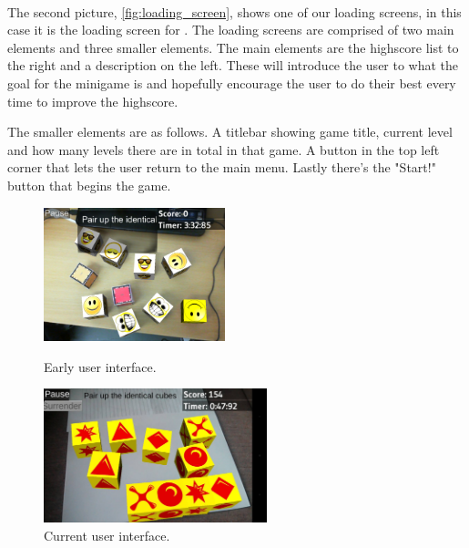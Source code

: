 \paragraph{}
The second picture, \autoref{fig:loading_screen}, shows one of our loading screens, in this case it is the loading screen for .
The loading screens are comprised of two main elements and three smaller elements.
The main elements are the highscore list to the right and a description on the left.
These will introduce the user to what the goal for the minigame is and hopefully encourage the user to do their best every time to improve the highscore.

The smaller elements are as follows. A titlebar showing game title, current level and how many levels there are in total in that game.
A button in the top left corner that lets the user return to the main menu. Lastly there's the "Start!" button that begins the game.

\begin{figure}[h]
	\centering
	\begin{minipage}{0.48\textwidth}
		\capstart
		\centering
		\includegraphics[height=110pt]{images/match_cubes_old}
		\caption[Previous UI in game.]{Early user interface.}
		\label{fig:early_user_interface}
	\end{minipage}
	\begin{minipage}{0.48\textwidth}
		\capstart
		\centering
		\includegraphics[height=110pt]{images/match_cubes_new}
		\caption[Current UI in game.]{Current user interface.}
		\label{fig:current_user_interface}
	\end{minipage}
\end{figure}

